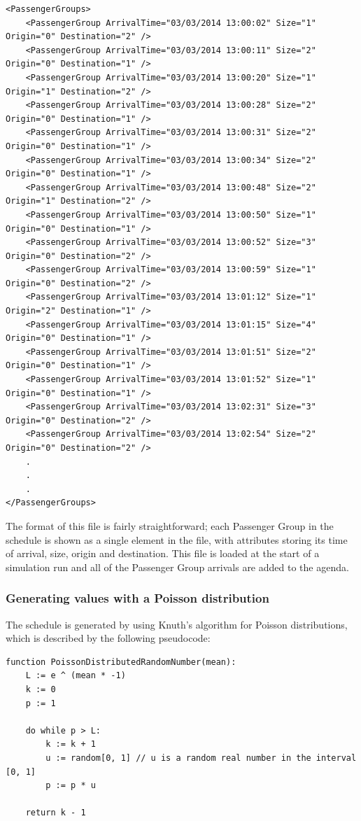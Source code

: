 \documentclass{UoYCSproject}
\begin{document}
\begin{lstlisting}
<PassengerGroups>
	<PassengerGroup ArrivalTime="03/03/2014 13:00:02" Size="1" Origin="0" Destination="2" />
	<PassengerGroup ArrivalTime="03/03/2014 13:00:11" Size="2" Origin="0" Destination="1" />
	<PassengerGroup ArrivalTime="03/03/2014 13:00:20" Size="1" Origin="1" Destination="2" />
	<PassengerGroup ArrivalTime="03/03/2014 13:00:28" Size="2" Origin="0" Destination="1" />
	<PassengerGroup ArrivalTime="03/03/2014 13:00:31" Size="2" Origin="0" Destination="1" />
	<PassengerGroup ArrivalTime="03/03/2014 13:00:34" Size="2" Origin="0" Destination="1" />
	<PassengerGroup ArrivalTime="03/03/2014 13:00:48" Size="2" Origin="1" Destination="2" />
	<PassengerGroup ArrivalTime="03/03/2014 13:00:50" Size="1" Origin="0" Destination="1" />
	<PassengerGroup ArrivalTime="03/03/2014 13:00:52" Size="3" Origin="0" Destination="2" />
	<PassengerGroup ArrivalTime="03/03/2014 13:00:59" Size="1" Origin="0" Destination="2" />
	<PassengerGroup ArrivalTime="03/03/2014 13:01:12" Size="1" Origin="2" Destination="1" />
	<PassengerGroup ArrivalTime="03/03/2014 13:01:15" Size="4" Origin="0" Destination="1" />
	<PassengerGroup ArrivalTime="03/03/2014 13:01:51" Size="2" Origin="0" Destination="1" />
	<PassengerGroup ArrivalTime="03/03/2014 13:01:52" Size="1" Origin="0" Destination="1" />
	<PassengerGroup ArrivalTime="03/03/2014 13:02:31" Size="3" Origin="0" Destination="2" />
	<PassengerGroup ArrivalTime="03/03/2014 13:02:54" Size="2" Origin="0" Destination="2" />
	.
	.
	.
</PassengerGroups>
\end{lstlisting}

The format of this file is fairly straightforward; each Passenger Group in the schedule is shown as a single element in the file, with attributes storing its time of arrival, size, origin and destination.  This file is loaded at the start of a simulation run and all of the Passenger Group arrivals are added to the agenda.

\subsubsection{Generating values with a Poisson distribution}

The schedule is generated by using Knuth's algorithm for Poisson distributions, which is described by the following pseudocode:  \citep{Ahrens1974, Atkinson1979}

\begin{lstlisting}
function PoissonDistributedRandomNumber(mean):
	L := e ^ (mean * -1)
	k := 0
	p := 1

	do while p > L:
		k := k + 1
		u := random[0, 1] // u is a random real number in the interval [0, 1]
		p := p * u

	return k - 1
\end{lstlisting}
\end{document}
